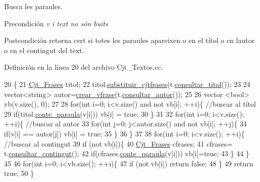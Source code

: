 Busca les paraules. 

\begin{DoxyPrecond}{Precondición}
{\itshape v i text no són buits } 
\end{DoxyPrecond}
\begin{DoxyPostcond}{Postcondición}
retorna cert si totes les paraules apareixen o en el títol o en l\textquotesingle{}autor o en el contingut del text. 
\end{DoxyPostcond}


Definición en la línea 20 del archivo Cjt\+\_\+\+Textos.\+cc.


\begin{DoxyCode}
20                                                          \{
21   \hyperlink{class_cjt___frases}{Cjt\_Frases} titol;
22   titol.\hyperlink{class_cjt___frases_ab61657ab1517fc6d640a80f8b54e8b83}{substituir\_cjtfrases}(t.\hyperlink{class_text_ac33cbed6f5553a4901a8440e215befb6}{consultar\_titol}());
23   
24   vector<string> autor=\hyperlink{_cjt___textos_8cc_a888edde821412b43dc1ad81adb3e9665}{crear\_vfrase}(t.\hyperlink{class_text_a0e8d29f53728da7b65ff1e87588ec407}{consultar\_autor}());
25   
26   vector <bool> vb(v.size(), 0);
27   
28   \textcolor{keywordflow}{for}(\textcolor{keywordtype}{int} i=0; i<v.size() and not vb[i]; ++i)\{  \textcolor{comment}{//buscar al títol}
29     \textcolor{keywordflow}{if}(titol.\hyperlink{class_cjt___frases_a6e45b67d225ed403aa0ce791d3bed726}{conte\_paraula}(v[i])) vb[i] = \textcolor{keyword}{true};
30   \}
31     
32   \textcolor{keywordflow}{for}(\textcolor{keywordtype}{int} i=0; i<v.size(); ++i)\{  \textcolor{comment}{//buscar al autor}
33     \textcolor{keywordflow}{for}(\textcolor{keywordtype}{int} j=0; j<autor.size() and not vb[i]; ++j)\{
34       \textcolor{keywordflow}{if}(v[i] == autor[j]) vb[i] = \textcolor{keyword}{true};
35     \}
36   \}
37     
38   \textcolor{keywordflow}{for}(\textcolor{keywordtype}{int} i=0; i<v.size(); ++i)\{  \textcolor{comment}{//buscar al contingut}
39     \textcolor{keywordflow}{if} (not vb[i])\{
40       \hyperlink{class_cjt___frases}{Cjt\_Frases} cfrases;
41       cfrases= t.\hyperlink{class_text_ae21dfb276d73f5a5b0994650335591c9}{consultar\_contingut}();
42       \textcolor{keywordflow}{if}(cfrases.\hyperlink{class_cjt___frases_a6e45b67d225ed403aa0ce791d3bed726}{conte\_paraula}(v[i])) vb[i]=\textcolor{keyword}{true};
43       \}
44   \}
45   
46   \textcolor{keywordflow}{for}(\textcolor{keywordtype}{int} i=0; i<vb.size(); ++i)\{
47     \textcolor{keywordflow}{if} (not vb[i]) \textcolor{keywordflow}{return} \textcolor{keyword}{false};
48     \}
49   \textcolor{keywordflow}{return} \textcolor{keyword}{true};
50 \}
\end{DoxyCode}
